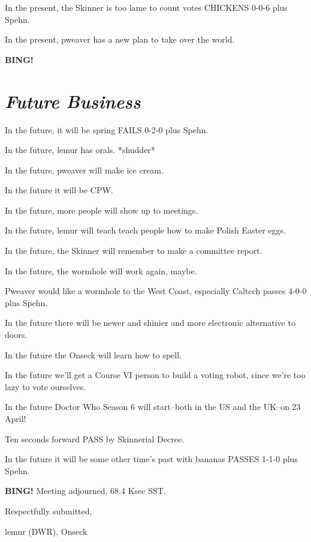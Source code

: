 \documentclass[10pt]{article}
\newcommand{\bing}{{\bf BING!} }
\newcommand{\goto}[1]{\bing \vskip 12pt \section*{{\em{#1}}}}
\newcommand{\ps}{ plus Spehn\xspace}
\newcommand{\onseck}{lemur (DWR), Onseck}
\begin{document}
In the present, the Skinner is too lame to count votes
CHICKENS 0-0-6\ps.

In the present, pweaver has a new plan to take over the
world.


\goto{Future Business}

In the future, it will be spring FAILS 0-2-0\ps.

In the future, lemur has orals.  *shudder*

In the future, pweaver will make ice cream.

In the future it will be CPW.

In the future, more people will show up to meetings.

In the future, lemur will teach teach people how to make
Polish Easter eggs.

In the future, the Skinner will remember to make a
committee report.

In the future, the wormhole will work again, maybe.

Pweaver would like a wormhole to the West Coast, 
especially Caltech passes 4-0-0\ps.

In the future there will be newer and shinier and
more electronic alternative to doors.

In the future the Onseck will learn how to spell.

In the future we'll get a Course VI person to build
a voting robot, since we're too lazy to vote ourselves.

In the future Doctor Who Season 6 will start--both in the
US and the UK--on 23 April!

Ten seconds forward PASS by Skinnerial Decree.

In the future it will be some other time's past
with bananas PASSES 1-1-0\ps.

\bing
\noindent
Meeting adjourned, 68.4 Ksec SST.

\vspace{18pt}

\centerline{Respectfully submitted,}
\centerline{\onseck}
\end{document}

